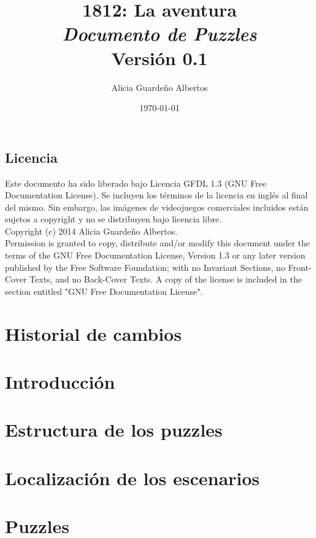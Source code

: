 \documentclass[a4paper,11pt,titlepage]{book}
\title{{\Huge \bf 1812: La aventura}\\{\large \em Documento de Puzzles}\\{\normalsize Versión 0.1}}
\author{Alicia Guardeño Albertos}
\date{\today}
\begin{document}
\renewcommand{\figurename}{Figura}
\renewcommand{\listfigurename}{Indice de figuras}
\renewcommand{\tablename}{Tabla}
\renewcommand{\listtablename}{Indice de tablas}

\vfill
\maketitle
\vfill
    \tableofcontents
    \listoffigures

\setlength{\parskip}{\baselineskip} %

\newpage
\section*{Licencia} %

Este documento ha sido liberado bajo Licencia GFDL 1.3 (GNU Free
Documentation License). Se incluyen los términos de la licencia en
inglés al final del mismo. Sin embargo, las imágenes de videojuegos comerciales incluidos están sujetos a copyright y no se distribuyen bajo licencia libre.\\

Copyright (c) 2014 Alicia Guardeño Albertos.\\

Permission is granted to copy, distribute and/or modify this document under the
terms of the GNU Free Documentation License, Version 1.3 or any later version
published by the Free Software Foundation; with no Invariant Sections, no
Front-Cover Texts, and no Back-Cover Texts. A copy of the license is included in
the section entitled "GNU Free Documentation License".\\

\newpage
\chapter{Historial de cambios}
\label{chap:historial}


\chapter{Introducción}%
\label{chap:introduccion}


\chapter{Estructura de los puzzles}
\label{chap:estructura}


\chapter{Localización de los escenarios}
\label{chap:localizacion}


\chapter{Puzzles}
\label{chap:puzzles}



\end{document}
